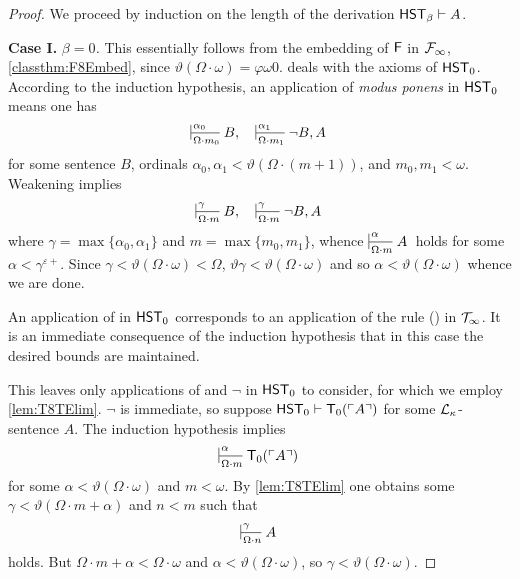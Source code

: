 \documentclass[UKenglish,cleveref,DIV=12]{scrartcl}
\theoremstyle{definition}
\theoremstyle{definition}
\begin{document}
\begin{proof} We proceed by induction on the length of the derivation $\mathsf{HST}_\beta\vdash A$.

\noindent\textbf{Case I.} \textit{${\beta=0}$.} This essentially follows from the
embedding of $\mathsf{F}$ in $\mathcal{F}_\infty$, \cref{classthm:F8Embed}, since $\vartheta(\Omega\cdot
\omega)=\varphi \omega0$.  deals with the axioms of $\mathsf{HST}_0$. According to the
induction hypothesis, an application of \emph{modus ponens} in $\mathsf{HST}_0$ means one has
\begin{align*}%
 \prov{\alpha_0}{\Omega\cdot m_0}{B,}&&\prov{\alpha_1}{\Omega\cdot m_1}{\lnot B,A}
\end{align*}
for some sentence $B$, ordinals $\alpha_0,\alpha_1<\vartheta(\Omega\cdot (m+1))$, and
$m_0,m_1<\omega$. Weakening implies
\begin{align*}
 \prov{\gamma}{\Omega\cdot m}{B,}&&\prov{\gamma}{\Omega\cdot m}{\lnot B,A}
\end{align*}
where $\gamma=\max\{\alpha_0,\alpha_1\}$ and $m=\max\{m_0,m_1\}$, whence $\prov\alpha{\Omega\cdot m} A$ holds for some $\alpha<\gamma^{\varepsilon+}$. Since
$\gamma<\vartheta(\Omega\cdot \omega)<\Omega$, $\vartheta\gamma<\vartheta(\Omega\cdot \omega)$ and so $\alpha<\vartheta(\Omega\cdot \omega)$ whence we are done.

An application of  in $\mathsf{HST}_0$ corresponds to an application of the
rule () in $\mathcal{T}_\infty$. It is an immediate consequence of the induction hypothesis that in this case the desired bounds are maintained.

This leaves only applications of  and $\lnot$ in $\mathsf{HST}_0$
to consider, for which we employ \cref{lem:T8TElim}. $\lnot$ is immediate, so suppose $\mathsf{HST}_0\vdash \mathsf{T}_0(\ulcorner{A}\urcorner)$ for some $\mathcal{L}_\kappa$-sentence $A$. The induction hypothesis implies
\begin{align}\label{eqn:T8embed3}
 \prov\alpha{\Omega\cdot m}{\T_0(\gn A)}
\end{align}
for some $\alpha<\vartheta(\Omega\cdot\omega)$ and $m<\omega$. By \cref{lem:T8TElim} one obtains some $\gamma<\vartheta(\Omega\cdot m+\alpha)$ and $n<m$ such that
\begin{align*}
 \prov\gamma{\Omega\cdot n}{A}
\end{align*}
holds. But $\Omega\cdot m+\alpha<\Omega\cdot \omega$ and $\alpha<\vartheta(\Omega\cdot \omega)$, so $\gamma<\vartheta(\Omega\cdot\omega)$.


\end{proof}
\end{document}
